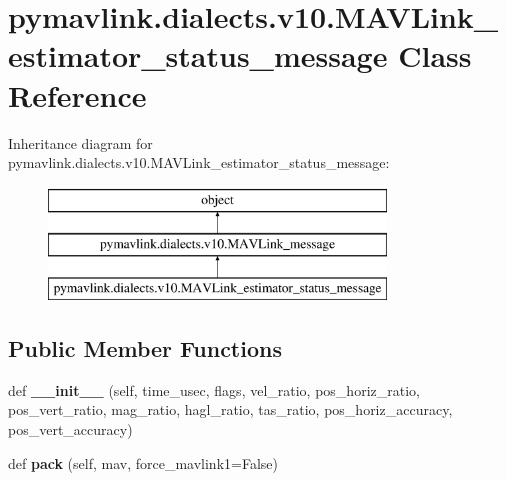 \hypertarget{classpymavlink_1_1dialects_1_1v10_1_1MAVLink__estimator__status__message}{}\section{pymavlink.\+dialects.\+v10.\+M\+A\+V\+Link\+\_\+estimator\+\_\+status\+\_\+message Class Reference}
\label{classpymavlink_1_1dialects_1_1v10_1_1MAVLink__estimator__status__message}
Inheritance diagram for pymavlink.\+dialects.\+v10.\+M\+A\+V\+Link\+\_\+estimator\+\_\+status\+\_\+message\+:\begin{figure}[H]
\begin{center}
\leavevmode
\includegraphics[height=3.000000cm]{classpymavlink_1_1dialects_1_1v10_1_1MAVLink__estimator__status__message}
\end{center}
\end{figure}
\subsection*{Public Member Functions}
\begin{DoxyCompactItemize}
\item 
\mbox{\label{classpymavlink_1_1dialects_1_1v10_1_1MAVLink__estimator__status__message_abd58c537b41e3f75ed5eaad72ce0e7fb}} 
def {\bfseries \+\_\+\+\_\+init\+\_\+\+\_\+} (self, time\+\_\+usec, flags, vel\+\_\+ratio, pos\+\_\+horiz\+\_\+ratio, pos\+\_\+vert\+\_\+ratio, mag\+\_\+ratio, hagl\+\_\+ratio, tas\+\_\+ratio, pos\+\_\+horiz\+\_\+accuracy, pos\+\_\+vert\+\_\+accuracy)
\item 
\mbox{\label{classpymavlink_1_1dialects_1_1v10_1_1MAVLink__estimator__status__message_ad942e088c4640a246b14a1742adc5b6f}} 
def {\bfseries pack} (self, mav, force\+\_\+mavlink1=False)
\end{DoxyCompactItemize}
